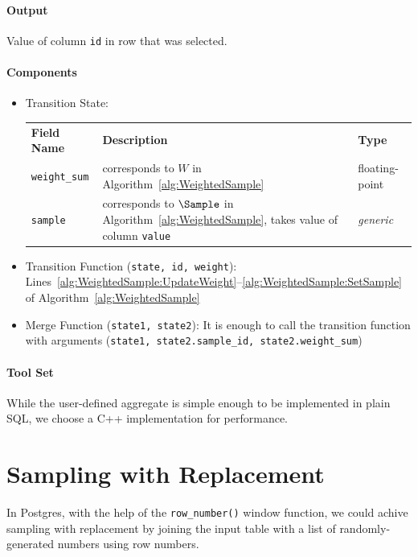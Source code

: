 \paragraph{Output}

Value of column \texttt{id} in row that was selected.

\paragraph{Components}

\begin{itemize}
	\item Transition State:
		\begin{center}
			\begin{tabularx}{\linewidth}{lXl}
				\toprule%
				\textbf{Field Name} & \textbf{Description} & \textbf{Type}
				\\\otoprule
				\texttt{weight\_sum} &
				corresponds to $W$ in Algorithm~\ref{alg:WeightedSample} &
				floating-point
				\\\midrule
				\texttt{sample} &
				corresponds to $\Sample$ in Algorithm~\ref{alg:WeightedSample}, takes value of column \texttt{value} &
				\textit{generic}
				\\\bottomrule
			\end{tabularx}
		\end{center}
	\item Transition Function (\texttt{state, id, weight}): Lines~\ref{alg:WeightedSample:UpdateWeight}--\ref{alg:WeightedSample:SetSample} of Algorithm~\ref{alg:WeightedSample}
	\item Merge Function (\texttt{state1, state2}): It is enough to call the transition function with arguments (\texttt{state1, state2.sample\_id, state2.weight\_sum})
\end{itemize}

\paragraph{Tool Set}

While the user-defined aggregate is simple enough to be implemented in plain SQL, we choose a C++ implementation for performance. 


\section{Sampling with Replacement} %
\label{sec:SamplingWithReplacement}
In Postgres, with the help of the \texttt{row\_number()} window function, we could achive sampling with replacement by joining the input table with a list of randomly-generated numbers using row numbers.

